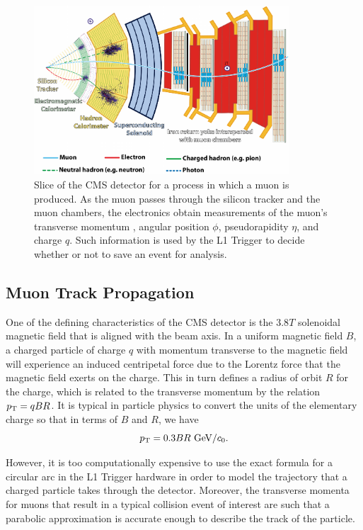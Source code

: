 \begin{figure}[htbp]
  \centering
  \includegraphics[width=0.85\textwidth]{fig/TPS/CMSslice_whiteBackground.pdf}
  \caption{
    Slice of the CMS detector for a process in which a muon is produced.
    As the muon passes through the silicon tracker and the muon chambers, the electronics obtain measurements of the muon's transverse momentum \pt, angular position $\phi$, pseudorapidity $\eta$, and charge $q$.
    Such information is used by the L1 Trigger to decide whether or not to save an event for analysis.
  }
  \label{fig:CMSslice}
\end{figure}

\subsection{Muon Track Propagation}
\label{subsec:prop}

One of the defining characteristics of the CMS detector is the $3.8\unit{T}$ solenoidal magnetic field that is aligned with the beam axis.
In a uniform magnetic field $B$, a charged particle of charge $q$ with momentum transverse to the magnetic field \pt will experience an induced centripetal force due to the Lorentz force that the magnetic field exerts on the charge.
This in turn defines a radius of orbit $R$ for the charge, which is related to the transverse momentum \pt by the relation $p_\mathrm{T}=qBR$. It is typical in particle physics to convert the units of the elementary charge so that in terms of $B$ and $R$, we have
\begin{equation}\label{eq:pt}
  \pt=0.3BR\unit{GeV/\clight}.
\end{equation}

However, it is too computationally expensive to use the exact formula for a circular arc in the L1 Trigger hardware in order to model the trajectory that a charged particle takes through the detector.
Moreover, the transverse momenta for muons that result in a typical collision event of interest are such that a parabolic approximation is accurate enough to describe the track of the particle.

